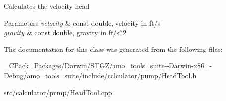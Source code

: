 Calculates the velocity head 
\begin{DoxyParams}{Parameters}
{\em velocity} & const double, velocity in ft/s \\
\hline
{\em gravity} & const double, gravity in ft/s$^\wedge$2 \\
\hline
\end{DoxyParams}


The documentation for this class was generated from the following files\+:\begin{DoxyCompactItemize}
\item 
\+\_\+\+C\+Pack\+\_\+\+Packages/\+Darwin/\+S\+T\+G\+Z/amo\+\_\+tools\+\_\+suite-\/-\/\+Darwin-\/x86\+\_-\/\+Debug/amo\+\_\+tools\+\_\+suite/include/calculator/pump/Head\+Tool.\+h\item 
src/calculator/pump/Head\+Tool.\+cpp\end{DoxyCompactItemize}
